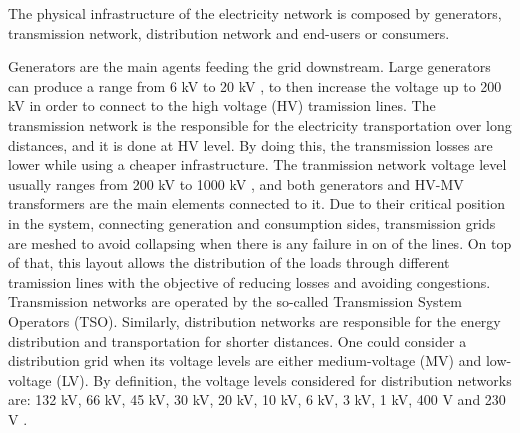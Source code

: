 The physical infrastructure of the electricity network is composed by generators, transmission network, distribution network and end-users or consumers.

%

Generators are the main agents feeding the grid downstream. Large generators can produce a range from 6 kV to 20 kV \cite{Gomez-Exposito2008}, to then increase the voltage up to 200 kV in order to connect to the high voltage (HV) tramission lines. The transmission network is the responsible for the electricity transportation over long distances, and it is done at HV level. By doing this, the transmission losses are lower while using a cheaper infrastructure. The tranmission network voltage level usually ranges from 200 kV to 1000 kV \cite{Erbach2016}, and both generators and HV-MV transformers are the main elements connected to it. Due to their critical position in the system, connecting generation and consumption sides, transmission grids are meshed to avoid collapsing when there is any failure in on of the lines. On top of that, this layout allows the distribution of the loads through different tramission lines with the objective of reducing losses and avoiding congestions. Transmission networks are operated by the so-called Transmission System Operators (TSO). Similarly, distribution networks are responsible for the energy distribution and transportation for shorter distances. One could consider a distribution grid when its voltage levels are either medium-voltage (MV) and low-voltage (LV). By definition, the voltage levels considered for distribution networks are: 132 kV, 66 kV, 45 kV, 30 kV, 20 kV, 10 kV, 6 kV, 3 kV, 1 kV, 400 V and 230 V \cite{Gomez-Exposito2008, Erbach2016}. 

